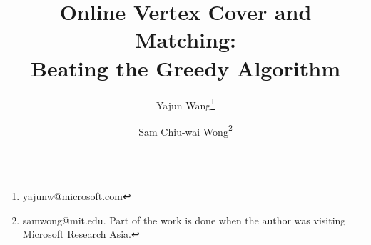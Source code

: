 \documentclass{article}
\begin{document}
\title{Online Vertex Cover and Matching:\\ Beating the Greedy Algorithm}


\author[1]{Yajun Wang\thanks{yajunw@microsoft.com}}
\author[2]{Sam Chiu-wai Wong\thanks{samwong@mit.edu. Part of the work is done when the author was visiting Microsoft Research Asia.}}

\end{document}
